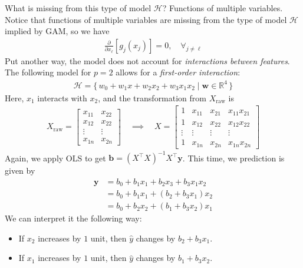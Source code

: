 \documentclass[12pt, a4paper]{article}
\theoremstyle{definition}
\begin{document}
	What is missing from this type of model $\mathcal{H}$? Functions of multiple
	variables.
	Notice that functions of multiple variables are missing from the type of
	model $\mathcal{H}$ implied by GAM, so we have
	\begin{align*}
		\frac{\partial}{\partial x_\ell} [g_j(x_j)] = 0,\quad \forall_{j\neq \ell}
	\end{align*}
	Put another way, the model does not account for \textit{interactions between features}.
	The following model for $p=2$ allows for a \textit{first-order interaction}:
	\begin{align*}
		\mathcal{H} = \{\,
		w_0 + w_1x + w_2x_2 + w_3x_1x_2 \mid \bm{w}\in \mathbb{R}^4
		\,\}
	\end{align*}
	Here, $x_1$ interacts with $x_2$, and the transformation from $X_\text{raw}$ is
	\begin{align*}
		X_\text{raw} = \begin{bmatrix}
			x_{11} & x_{22}\\
			x_{12} & x_{22}\\
			\vdots & \vdots\\
			x_{1n} & x_{2n}
		\end{bmatrix}
		\quad
		\implies
		\quad
		X = \begin{bmatrix}
			1 & x_{11} & x_{21} & x_{11} x_{21}\\
			1 & x_{12} & x_{22} & x_{12} x_{22}\\
			\vdots & \vdots & \vdots & \vdots\\
			1 & x_{1n} & x_{2n} & x_{1n}x_{2n}
		\end{bmatrix}
	\end{align*}
	Again, we apply OLS to get $\bm{b} = (X^\top X)^{-1}X^\top \bm{y}$.
	This time, we prediction is given by
	\begin{align*}
		\bm{y}
		&= b_0 + b_1x_1 + b_2x_3 + b_3x_1x_2\\
		&= b_0 + b_1x_1 + (b_2 + b_3x_1)x_2\\
		&= b_0 + b_2x_2 + (b_1 + b_3x_2)x_1
	\end{align*}
	We can interpret it the following way:
	\begin{itemize}
		\item If $x_2$ increases by $1$ unit, then $\hat{y}$ changes by $b_2+b_3x_1$.
		\item If $x_1$ increases by $1$ unit, then $\hat{y}$ changes by $b_1+b_3x_2$.
	\end{itemize}
	\pagebreak
	\printbibliography
\end{document}
